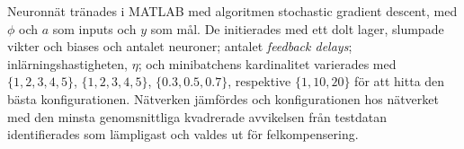 Neuronnät tränades i MATLAB med algoritmen stochastic gradient descent,
med $\phi$ och $a$ som inputs och $y$ som mål.
De initierades med ett dolt lager, slumpade vikter och biases
och antalet neuroner; antalet \emph{feedback delays};
inlärningshastigheten, $\eta$; och minibatchens kardinalitet varierades med
$ \{ 1, 2, 3, 4, 5 \} $, $ \{ 1, 2, 3, 4, 5 \} $,
$ \{ 0.3, 0.5, 0.7 \} $, respektive $ \{ 1, 10, 20 \} $
för att hitta den bästa konfigurationen.
Nätverken jämfördes och konfigurationen hos nätverket med
den minsta genomsnittliga kvadrerade avvikelsen från testdatan
identifierades som lämpligast och valdes ut för felkompensering.
